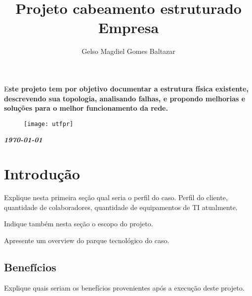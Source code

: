 \documentclass[	DIV=calc,%
paper=a4,%
fontsize=12pt,%
onecolumn]{scrartcl}	 					%
\title{Projeto cabeamento estruturado Empresa}					%
\author{Gelso Magdiel Gomes Baltazar}  	%
\date{}																				%
\newcommand{\initial}[1]{%
	\lettrine[lines=3,lhang=0.3,nindent=0em]{
		\color{DarkGoldenrod}
		{\textsf{#1}}}{}}
\begin{document}
	\maketitle
	\thispagestyle{fancy} 	
	\thispagestyle{empty}		%
	
	
	
	
	\initial{E}\textbf{ste projeto tem por objetivo documentar a estrutura física existente, descrevendo sua topologia, analisando falhas, e propondo melhorias e soluções para o melhor funcionamento da rede.}
	
	\begin{figure}
		\centering
		\texttt{[image: utfpr]}
	\end{figure}
	
	\vspace{3cm}
	\centerline{\textit{\textbf{\today}}}
	
	\clearpage
	\renewcommand*\listfigurename{Lista de figuras}
	\listoffigures
	
	\renewcommand*\listtablename{Lista de tabelas}
	\listoftables
	
	
	
	
	\clearpage
	\renewcommand{\contentsname}{Sumário}
	\tableofcontents
	\clearpage
	
	\section{Introdução}
	Explique nesta primeira seção qual seria o perfil do caso. Perfil do cliente, quantidade de colaboradores, quantidade de equipamentos de TI atualmente.
	
	Indique também nesta seção o escopo do projeto.
	
	Apresente um overview do parque tecnológico do caso.
	\subsection{Benefícios}
	Explique quais seriam os benefícios provenientes após a execução deste projeto.
	
\end{document}

